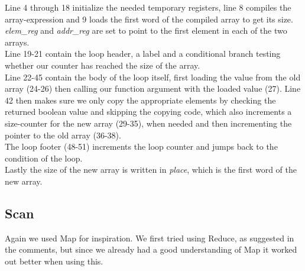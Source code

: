 \documentclass{article}
\begin{document}
Line 4 through 18 initialize the needed temporary registers, line 8 compiles the array-expression and 9 loads the first word of the compiled array to get its size. \textit{elem\_reg} and \textit{addr\_reg} are set to point to the first element in each of the two arrays.\\
Line 19-21 contain the loop header, a label and a conditional branch testing whether our counter has reached the size of the array.\\
Line 22-45 contain the body of the loop itself, first loading the value from the old array (24-26) then calling our function argument with the loaded value (27). Line 42 then makes sure we only copy the appropriate elements by checking the returned boolean value and skipping the copying code, which also increments a size-counter for the new array (29-35), when needed and then incrementing the pointer to the old array (36-38).\\
The loop footer (48-51) increments the loop counter and jumps back to the condition of the loop.\\
Lastly the size of the new array is written in \textit{place}, which is the first word of the new array. 

\subsection{Scan}
Again we used Map for inspiration. We first tried using Reduce, as suggested in the comments, but since we already had a good understanding of Map it worked out better when using this.\\
\end{document}
